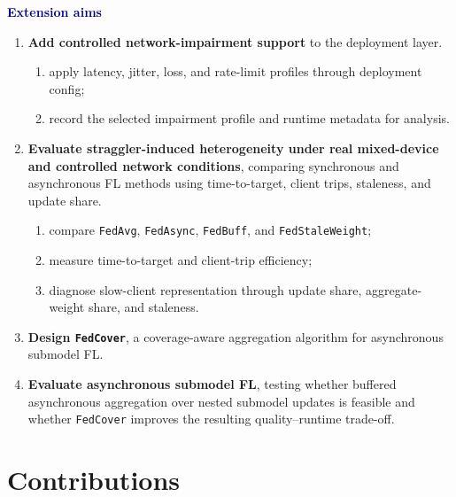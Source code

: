 \begin{aimbox}
\textbf{\textcolor{darkblue}{Extension aims}}
\begin{enumerate}[label=(\alph*), topsep=6pt, itemsep=6pt]
  \item \label{eaim:a}\textbf{Add controlled network-impairment support} to the deployment layer.
  \begin{enumerate}[label=(\arabic*), leftmargin=2.5em, topsep=2pt, itemsep=2pt]
    \item \label{eaim:a.1}apply latency, jitter, loss, and rate-limit profiles through deployment config;
    \item \label{eaim:a.2}record the selected impairment profile and runtime metadata for analysis.
  \end{enumerate}

  \item \label{eaim:b}\textbf{Evaluate straggler-induced heterogeneity under real mixed-device and controlled network conditions}, comparing synchronous and asynchronous FL methods using time-to-target, client trips, staleness, and update share.
  \begin{enumerate}[label=(\arabic*), leftmargin=2.5em, topsep=2pt, itemsep=2pt]
    \item \label{eaim:b.1}compare \texttt{FedAvg}, \texttt{FedAsync}, \texttt{FedBuff}, and \texttt{FedStaleWeight};
    \item \label{eaim:b.2}measure time-to-target and client-trip efficiency;
    \item \label{eaim:b.3}diagnose slow-client representation through update share, aggregate-weight share, and staleness.
  \end{enumerate}

  \item \label{eaim:c}\textbf{Design \texttt{FedCover}}, a coverage-aware aggregation algorithm for asynchronous submodel FL.
  \item \label{eaim:d}\textbf{Evaluate asynchronous submodel FL}, testing whether buffered asynchronous aggregation over nested submodel updates is feasible and whether \texttt{FedCover} improves the resulting quality--runtime trade-off.
\end{enumerate}
\end{aimbox}

\section{Contributions}

